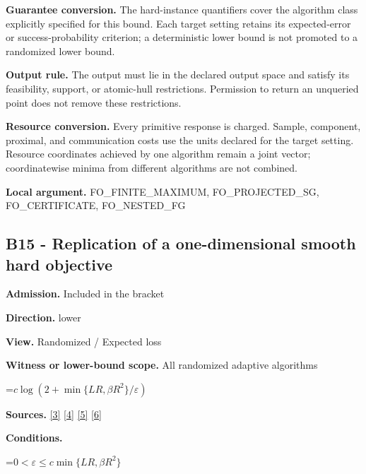 \documentclass[10pt,a4paper]{article}
\newcommand{\AtlasMath}[1]{\par\begingroup\centering\setbox0=\hbox{$\displaystyle #1$}\ifdim\wd0>1.4\linewidth\typeout{ATLAS WIDE FORMULA: \the\wd0}\fi\ifdim\wd0>\linewidth\resizebox{\linewidth}{!}{\box0}\else\box0\fi\par\endgroup}
\begin{document}
\textbf{Guarantee conversion.} The hard-instance quantifiers cover the algorithm class explicitly specified for this bound. Each target setting retains its expected-error or success-probability criterion; a deterministic lower bound is not promoted to a randomized lower bound.



\textbf{Output rule.} The output must lie in the declared output space and satisfy its feasibility, support, or atomic-hull restrictions. Permission to return an unqueried point does not remove these restrictions.



\textbf{Resource conversion.} Every primitive response is charged. Sample, component, proximal, and communication costs use the units declared for the target setting. Resource coordinates achieved by one algorithm remain a joint vector; coordinatewise minima from different algorithms are not combined.



\textbf{Local argument.} FO\_FINITE\_MAXIMUM, FO\_PROJECTED\_SG, FO\_CERTIFICATE, FO\_NESTED\_FG



\subsection{B15 - Replication of a one-dimensional smooth hard objective}


\textbf{Admission.} Included in the bracket



\textbf{Direction.} lower



\textbf{View.} Randomized / Expected loss



\textbf{Witness or lower-bound scope.} All randomized adaptive algorithms



\AtlasMath{c\log(2+\min\{LR,\beta R^2\}/\varepsilon)}


\textbf{Sources.} \href{https://arxiv.org/pdf/2311.10886}{[3]} \href{https://arxiv.org/pdf/1405.4980}{[4]} \href{https://www2.isye.gatech.edu/~nemirovs/MOR_AccuracyCertificates.pdf}{[5]} \href{https://arxiv.org/pdf/2609.20701}{[6]}



\textbf{Conditions.}
\AtlasMath{0<\varepsilon\le c\min\{LR,\beta R^2\}}
\end{document}
